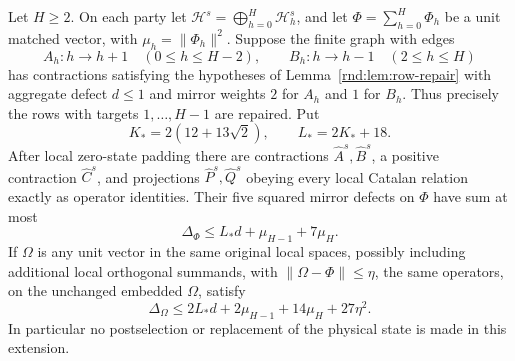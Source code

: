 \begin{lemma}\label{rnd:lem:exact-extension}
Let $H\ge2$. On each party let $\mathcal H^s=\bigoplus_{h=0}^H\mathcal H_h^s$, and let $\Phi=\sum_{h=0}^H\Phi_h$ be a unit matched vector, with $\mu_h=\|\Phi_h\|^2$. Suppose the finite graph with edges
\[
 A_h:h\longrightarrow h+1\quad(0\le h\le H-2),\qquad
 B_h:h\longrightarrow h-1\quad(2\le h\le H)
\]
has contractions satisfying the hypotheses of Lemma~\ref{rnd:lem:row-repair} with aggregate defect $d\le1$ and mirror weights $2$ for $A_h$ and $1$ for $B_h$. Thus precisely the rows with targets $1,\dots,H-1$ are repaired. Put
\[
 K_*=2(12+13\sqrt2),\qquad L_*=2K_*+18.
\]
After local zero-state padding there are contractions $\widehat A^s,\widehat B^s$, a positive contraction $\widehat C^s$, and projections $\widehat P^s,\widehat Q^s$ obeying every local Catalan relation exactly as operator identities. Their five squared mirror defects on $\Phi$ have sum at most
\[
 \Delta_\Phi\le L_*d+\mu_{H-1}+7\mu_H.
 \tag{EX}
\]
If $\Omega$ is any unit vector in the same original local spaces, possibly including additional local orthogonal summands, with $\|\Omega-\Phi\|\le\eta$, the same operators, on the unchanged embedded $\Omega$, satisfy
\[
 \Delta_\Omega\le2L_*d+2\mu_{H-1}+14\mu_H+27\eta^2.
 \tag{EX'}
\]
In particular no postselection or replacement of the physical state is made in this extension.
\end{lemma}


